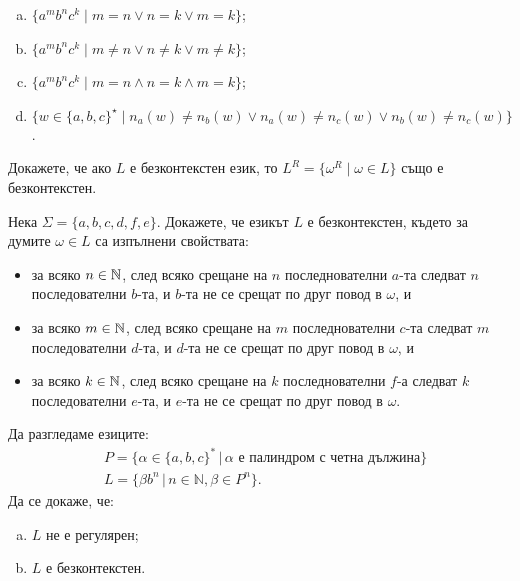 \begin{problem}
\begin{enumerate}[a)]
  \item
    $\{a^mb^nc^k\mid m = n \vee n = k \vee m = k\}$;
  \item
    $\{a^mb^nc^k\mid m \neq n \vee n \neq k \vee m \neq k\}$;
  \item
    $\{a^mb^nc^k\mid m = n \wedge n = k \wedge m = k\}$;
  \item
    $\{w \in \{a,b,c\}^\star\mid n_a(w) \neq n_b(w) \vee n_a(w) \neq n_c(w) \vee n_b(w) \neq n_c(w)\}$.
  \end{enumerate}
\end{problem}

\begin{problem}
  Докажете, че ако $L$ е безконтекстен език, то $L^R = \{\omega^R \mid \omega \in L\}$ 
  също е безконтекстен.
\end{problem}

\begin{problem}
  Нека $\Sigma = \{a,b,c,d,f,e\}$.
  Докажете, че езикът $L$ е безконтекстен, където за думите $\omega \in L$ са изпълнени свойствата:
  \begin{itemize}[-]
  \item 
    за всяко $n\in\mathbb{N}$, след всяко срещане на $n$ последнователни $a$-та
    следват $n$ последователни $b$-та, и $b$-та не се срещат по друг повод в $\omega$, и
  \item
    за всяко $m\in\mathbb{N}$, след всяко срещане на $m$ последнователни $c$-та
    следват $m$ последователни $d$-та, и $d$-та не се срещат по друг повод в $\omega$, и
  \item
    за всяко $k\in\mathbb{N}$, след всяко срещане на $k$ последнователни $f$-а
    следват $k$ последователни $e$-та, и $e$-та не се срещат по друг повод в $\omega$.
  \end{itemize}
\end{problem}

\begin{problem}
  Да разгледаме езиците:
  \begin{align*}
    & P = \{\alpha\in\{a,b,c\}^*\,|\, \alpha \text{ е палиндром с четна дължина}\} \\
    & L =  \{\beta b^n\,|\, n\in\mathbb{N}, \beta\in P^n\}.
  \end{align*}
  Да се докаже, че:
  \begin{enumerate}[a)]
  \item 
    $L$ не е регулярен;
  \item 
    $L$ е безконтекстен.
  \end{enumerate}
\end{problem}


